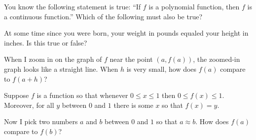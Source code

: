 \documentclass{ximera}
\newcommand{\recommendation}[1]{}
\newcommand{\GoodQuestions}[1]{}
\begin{document}
\begin{problem}
  \recommendation{Elizabeth}
  \GoodQuestions{Subject: Continuity and the Intermediate Value Theorem 4Q}
  You know the following statement is true: ``If $f$ is a
    polynomial function, then $f$ is a continuous function.''  Which
    of the following must also be true?
  \begin{multipleChoice}
  \end{multipleChoice}
\end{problem}


\begin{problem}
  \recommendation{Vic} \GoodQuestions{Subject: Continuity and the Intermediate Value Theorem 7P}
  At some time since you were born, your weight in pounds equaled your height in inches.  Is this true or false?
\begin{multipleChoice}
\end{multipleChoice}
\end{problem}


\begin{problem}
  \recommendation{Vic}
  When I zoom in on the graph of $f$ near the
  point $(a,f(a))$, the zoomed-in graph looks like a straight line.
  When $h$ is very small, how does $f(a)$ compare to $f(a+h)$?
  \begin{multipleChoice}
  \end{multipleChoice}
\end{problem}

\begin{problem}
  Suppose $f$ is a function so that whenever $0 \leq x \leq 1$ then
  $0 \leq f(x) \leq 1$.  Moreover, for all $y$ between $0$ and $1$
  there is some $x$ so that $f(x) = y$.

  Now I pick two numbers $a$ and $b$ between $0$ and $1$ so that $a
  \approx b$.  How does $f(a)$ compare to $f(b)$?
  \begin{multipleChoice}
  \end{multipleChoice}
\end{problem}
\end{document}
